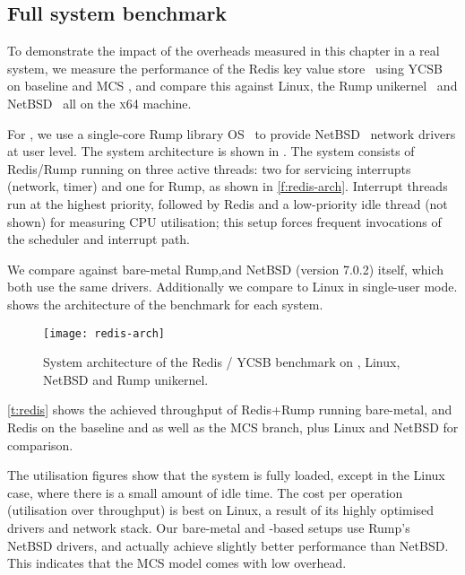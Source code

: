 \subsection{Full system benchmark}
\label{s:evaluation-redis-overhead}

To demonstrate the impact of the overheads measured in this chapter in a real system,
we measure the performance of the Redis key value store~\citep{redis:url} using 
\gls{YCSB}~\citep{Cooper_STRS_10} on baseline and MCS \selfour, and compare this
against Linux, the Rump unikernel~\citep{Kantee_Cormack_14} and 
NetBSD~\citep{NetBSD:url} all on the \textsc{x64} machine.

For \selfour, we use a single-core Rump library OS~\citep{Kantee_Cormack_14} to provide 
NetBSD~\citep{NetBSD:url} network drivers at user level. The system architecture is 
shown in \label{f:redis-arch}. 
The system consists of Redis/Rump running on three active \selfour threads: 
two for servicing interrupts (network, timer) and one for Rump, as shown in
\autoref{f:redis-arch}. Interrupt threads run at the highest priority,
followed by Redis and a low-priority idle thread (not shown) for measuring CPU utilisation;
this setup forces frequent invocations of the scheduler and interrupt path.

We compare against bare-metal Rump,and
NetBSD (version 7.0.2) itself, which both use the same drivers. Additionally we compare to Linux 
in single-user mode.  shows the architecture of the benchmark for each system. 

 \begin{figure}[ht]
    \centering
    \texttt{[image: redis-arch]}
    \caption{System architecture of the Redis / \gls{YCSB} benchmark on \selfour, 
        Linux, NetBSD and Rump unikernel.}
    \label{f:redis-arch}
\end{figure}


\autoref{t:redis} shows the achieved throughput of Redis+Rump
running  bare-metal, and Redis on the \selfour baseline and as well as the MCS
branch, plus Linux and NetBSD for comparison.

The utilisation figures show that the system is fully loaded, except
in the Linux case, where there is a small amount of idle time. The
cost per operation (utilisation over throughput) is best on Linux, a
result of its highly optimised drivers and network stack. Our
bare-metal and \selfour-based setups use Rump's NetBSD drivers, and
actually achieve slightly better performance than NetBSD. This
indicates that the MCS model comes with low overhead.

